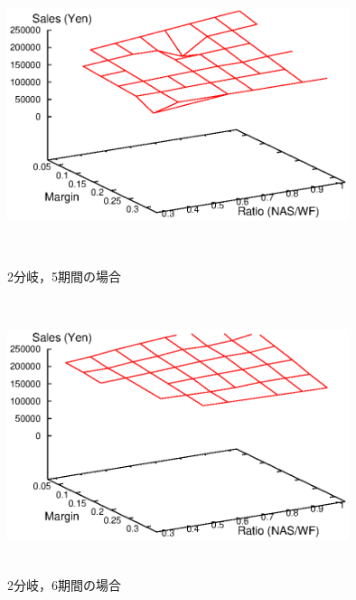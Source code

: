 \documentclass[a4paper,12pt,showkeys]{jreport}
\begin{document}
\begin{figure}[]
 \begin{minipage}{0.5\hsize}
  \begin{center}
   \includegraphics[width=10cm,height=8cm, clip]{stdout_C2_T5_data_m.eps}
  \end{center}
  \caption{2分岐，5期間の場合}
  \label{fig:C2_T5}
 \end{minipage}
 \begin{minipage}{0.5\hsize}
  \begin{center}
   \includegraphics[width=10cm,height=8cm, clip]{stdout_C2_T6_data_m.eps}
  \end{center}
  \caption{2分岐，6期間の場合}
  \label{fig:C2_T6}
 \end{minipage}
\end{figure}
\end{document}
